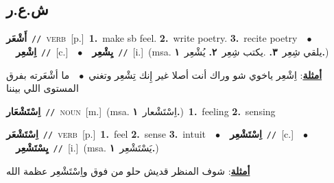 \documentclass[10pt,a4paper,twoside]{article} %
\begin{document}
\begin{multicols}{2}
\vspace{-3mm}
\subsection*{\color{blue}\foreignlanguage{arabic}{ش.ع.ر}\color{blue}{}} 

{\setlength\topsep{0pt}\textbf{\foreignlanguage{arabic}{أَشْعَر}}\ {\color{gray}\texttt{//}\color{black}}\ \textsc{verb}\ [p.]\ \textbf{1.}~make sb feel.  \textbf{2.}~write poetry.  \textbf{3.}~recite poetry\ \ $\bullet$\ \ \setlength\topsep{0pt}\textbf{\foreignlanguage{arabic}{اِشْعِر}}\ {\color{gray}\texttt{//}\color{black}}\ [c.]\ \ $\bullet$\ \ \setlength\topsep{0pt}\textbf{\foreignlanguage{arabic}{يِشْعِر}}\ {\color{gray}\texttt{//}\color{black}}\ [i.]\ \color{gray}(msa. \foreignlanguage{arabic}{يلقي شِعِر}~\foreignlanguage{arabic}{\textbf{٣.}}  .\foreignlanguage{arabic}{يكتب شِعِر}~\foreignlanguage{arabic}{\textbf{٢.}}  \foreignlanguage{arabic}{يُشْعِر}~\foreignlanguage{arabic}{\textbf{١.}})\color{black}\  \begin{flushright}\color{gray}\foreignlanguage{arabic}{\textbf{\underline{\foreignlanguage{arabic}{أمثلة}}}: اِشْعِر ياخوي شو وراك أنت أصلا غير إِنك تِشْعِر وتغني\ $\bullet$\ \  ما أشْعَرته بفرق المستوى اللي بيننا}\end{flushright}\color{black}} \vspace{2mm}

{\setlength\topsep{0pt}\textbf{\foreignlanguage{arabic}{اِسْتَشْعَار}}\ {\color{gray}\texttt{//}\color{black}}\ \textsc{noun}\ [m.]\ \color{gray}(msa. \foreignlanguage{arabic}{اِسْتَشْعار}~\foreignlanguage{arabic}{\textbf{١.}})\color{black}\ \textbf{1.}~feeling  \textbf{2.}~sensing\ } \vspace{2mm}

{\setlength\topsep{0pt}\textbf{\foreignlanguage{arabic}{اِسْتَشْعَر}}\ {\color{gray}\texttt{//}\color{black}}\ \textsc{verb}\ [p.]\ \textbf{1.}~feel  \textbf{2.}~sense  \textbf{3.}~intuit\ \ $\bullet$\ \ \setlength\topsep{0pt}\textbf{\foreignlanguage{arabic}{اِسْتَشْعِر}}\ {\color{gray}\texttt{//}\color{black}}\ [c.]\ \ $\bullet$\ \ \setlength\topsep{0pt}\textbf{\foreignlanguage{arabic}{يِسْتَشْعِر}}\ {\color{gray}\texttt{//}\color{black}}\ [i.]\ \color{gray}(msa. \foreignlanguage{arabic}{يَسْتَشْعِر}~\foreignlanguage{arabic}{\textbf{١.}})\color{black}\  \begin{flushright}\color{gray}\foreignlanguage{arabic}{\textbf{\underline{\foreignlanguage{arabic}{أمثلة}}}: شوف المنظر قديش حلو من فوق واِسْتَشْعِر عظمة الله}\end{flushright}\color{black}} \vspace{2mm}


\end{multicols}
\end{document}
